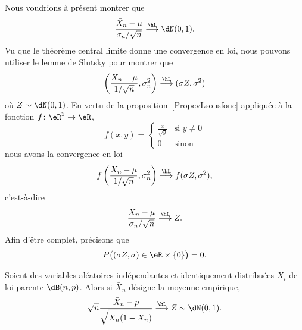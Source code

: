 \begin{example}
	Nous voudrions à présent montrer que
	\begin{equation}
		\frac{ \bar X_n-\mu }{ \sigma_n/\sqrt{n} }\stackrel{\hL}{\longrightarrow}\dN(0,1).
	\end{equation}
	Vu que le théorème central limite donne une convergence en loi, nous pouvons utiliser le lemme de Slutsky pour montrer que
	\begin{equation}
		\left( \frac{ \bar X_n-\mu }{ 1/\sqrt{n} },\sigma_n^2 \right)\stackrel{\hL}{\longrightarrow}(\sigma Z,\sigma^2)
	\end{equation}
	où \( Z\sim\dN(0,1)\). En vertu de la proposition~\ref{PropcvLsousfonc} appliquée à la fonction \( f\colon \eR^2\to \eR\),
	\begin{equation}
		f(x,y)=\begin{cases}
			\frac{ x }{ \sqrt{y} } & \text{si } y\neq 0 \\
			0                      & \text{sinon}
		\end{cases}
	\end{equation}
	nous avons la convergence en loi
	\begin{equation}
		f\left( \frac{ \bar X_n-\mu }{ 1/\sqrt{n} },\sigma_n^2 \right)\stackrel{\hL}{\longrightarrow}f(\sigma Z,\sigma^2),
	\end{equation}
	c'est-à-dire
	\begin{equation}
		\frac{ \bar X_n-\mu }{ \sigma_n/\sqrt{n} }\stackrel{\hL}{\longrightarrow}Z.
	\end{equation}
	Afin d'être complet, précisons que
	\begin{equation}
		P\big( (\sigma Z,\sigma)\in\eR\times \{ 0 \} \big)=0.
	\end{equation}
\end{example}

\begin{proposition}     \label{PropLimxBNpxbxbsqrt}
	Soient des variables aléatoires indépendantes et identiquement distribuées \( X_i\) de loi parente \( \dB(n,p)\). Alors si \( \bar X_n\) désigne la moyenne empirique,
	\begin{equation}
		\sqrt{n}\frac{ \bar X_n-p }{ \sqrt{\bar X_n(1-\bar X_n)} }\stackrel{\hL}{\longrightarrow}Z\sim\dN(0,1).
	\end{equation}
\end{proposition}

